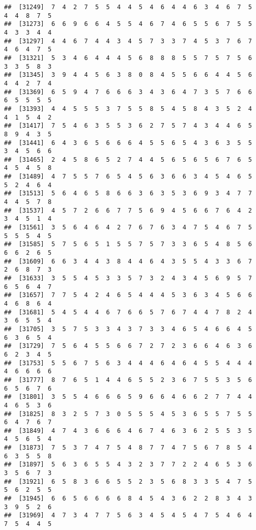 \documentclass[
]{book}
\begin{document}
\begin{verbatim}
##  [31249]  7  4  2  7  5  5  4  4  5  4  6  4  4  6  3  4  6  7  5  4  4  8  7  5
##  [31273]  6  6  9  6  6  4  5  5  4  6  7  4  6  5  5  6  7  5  5  4  3  3  4  4
##  [31297]  4  4  6  7  4  4  3  4  5  7  3  3  7  4  5  3  7  6  7  4  6  4  7  5
##  [31321]  5  3  4  6  4  4  4  5  6  8  8  8  5  5  7  5  7  5  6  3  3  5  8  3
##  [31345]  3  9  4  4  5  6  3  8  0  8  4  5  5  6  6  4  4  5  6  4  4  2  7  4
##  [31369]  6  5  9  4  7  6  6  6  3  4  3  6  4  7  3  5  7  6  6  6  5  5  5  5
##  [31393]  4  4  5  5  5  3  7  5  5  8  5  4  5  8  4  3  5  2  4  4  1  5  4  2
##  [31417]  7  5  4  6  3  5  5  3  6  2  7  5  7  4  3  4  4  6  5  8  9  4  3  5
##  [31441]  6  4  3  6  5  6  6  6  4  5  5  6  5  4  3  6  3  5  5  3  4  5  6  6
##  [31465]  2  4  5  8  6  5  2  7  4  4  5  6  5  6  5  6  7  6  5  4  5  4  5  8
##  [31489]  4  7  5  5  7  6  5  4  5  6  3  6  6  3  4  5  4  6  5  5  2  4  6  4
##  [31513]  5  6  4  6  5  8  6  6  3  6  3  5  3  6  9  3  4  7  7  4  4  5  7  8
##  [31537]  4  5  7  2  6  6  7  7  5  6  9  4  5  6  6  7  6  4  2  3  4  5  1  4
##  [31561]  3  5  6  4  6  4  2  7  6  7  6  3  4  7  5  4  6  7  5  5  5  5  4  5
##  [31585]  5  7  5  6  5  1  5  5  7  5  7  3  3  6  5  4  8  5  6  6  6  2  6  5
##  [31609]  6  6  3  4  4  3  8  4  4  6  4  3  5  5  4  3  3  6  7  2  6  8  7  3
##  [31633]  3  5  5  4  5  3  3  5  7  3  2  4  3  4  5  6  9  5  7  6  5  6  4  7
##  [31657]  7  7  5  4  2  4  6  5  4  4  4  5  3  6  3  4  5  6  6  4  6  8  6  4
##  [31681]  5  4  5  4  4  6  7  6  6  5  7  6  7  4  4  7  8  2  4  3  6  5  5  4
##  [31705]  3  5  7  5  3  3  4  3  7  3  3  4  6  5  4  6  6  4  5  6  3  6  5  4
##  [31729]  7  5  6  4  5  5  6  6  7  2  7  2  3  6  6  4  6  3  6  6  2  3  4  5
##  [31753]  5  5  6  7  5  6  3  4  4  4  6  4  6  4  5  5  4  4  4  4  6  6  6  6
##  [31777]  8  7  6  5  1  4  4  6  5  5  2  3  6  7  5  5  3  5  6  6  5  6  7  6
##  [31801]  3  5  5  4  6  6  6  5  9  6  6  4  6  6  2  7  7  4  4  4  6  5  3  6
##  [31825]  8  3  2  5  7  3  0  5  5  5  4  5  3  6  5  5  7  5  5  6  4  7  6  7
##  [31849]  4  7  4  3  6  6  6  4  6  7  4  6  3  6  2  5  5  3  5  4  5  6  5  4
##  [31873]  7  5  3  7  4  7  5  4  8  7  7  4  7  5  6  7  8  5  4  6  3  5  5  8
##  [31897]  5  6  3  6  5  5  4  3  2  3  7  7  2  2  4  6  5  3  6  3  5  6  7  3
##  [31921]  6  5  8  3  6  6  5  5  2  3  5  6  8  3  3  5  4  7  5  5  6  2  5  5
##  [31945]  6  6  5  6  6  6  6  8  4  5  4  3  6  2  2  8  3  4  3  3  9  5  2  6
##  [31969]  4  7  3  4  7  7  5  6  3  4  5  4  5  4  7  5  4  6  4  7  5  4  4  5

\end{verbatim}
\end{document}
